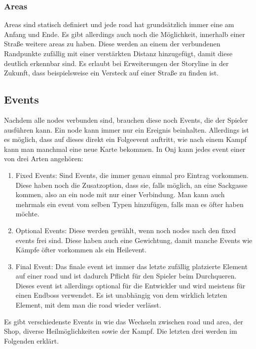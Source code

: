 \subsubsection{Areas}\label{subsubsec:areas}
Areas sind statisch definiert und jede road hat grundsätzlich immer eine am Anfang und Ende.
Es gibt allerdings auch noch die Möglichkeit, innerhalb einer Straße weitere areas zu haben.
Diese werden an einem der verbundenen Randpunkte zufällig mit einer verstärkten Distanz hinzugefügt, damit diese deutlich erkennbar sind.
Es erlaubt bei Erweiterungen der Storyline in der Zukunft, dass beispielsweise ein Versteck auf einer Straße zu finden ist.

\subsection{Events}\label{subsec:events}
Nachdem alle nodes verbunden sind, brauchen diese noch Events, die der Spieler ausführen kann.
Ein node kann immer nur ein Ereignis beinhalten.
Allerdings ist es möglich, dass auf dieses direkt ein Folgeevent auftritt, wie \zB nach einem Kampf kann man manchmal eine neue Karte bekommen.
In Onj kann jedes event einer von drei Arten angehören:

\begin{enumerate}
    \item Fixed Events: Sind Events, die immer genau einmal pro Eintrag vorkommen.
    Diese haben noch die Zusatzoption, dass sie, falls möglich, an eine Sackgasse kommen, also an ein node mit nur einer Verbindung.
    Man kann auch mehrmals ein event vom selben Typen hinzufügen, falls man es öfter haben möchte.
    \item Optional Events: Diese werden gewählt, wenn noch nodes nach den fixed events frei sind.
    Diese haben auch eine Gewichtung, damit manche Events wie Kämpfe öfter vorkommen als \zB ein Heilevent.
    \item Final Event: Das finale event ist immer das letzte zufällig platzierte Element auf einer road und ist dadurch Pflicht für den Spieler beim Durchqueren.
    Dieses event ist allerdings optional für die Entwickler und wird meistens für einen Endboss verwendet.
    Es ist unabhängig von dem wirklich letzten Element, mit dem man die road wieder verlässt.
\end{enumerate}

Es gibt verschiedenste Events in \FF wie das Wechseln zwischen road und area, der Shop, diverse Heilmöglichkeiten sowie der Kampf.
Die letzten drei werden im Folgenden erklärt.

